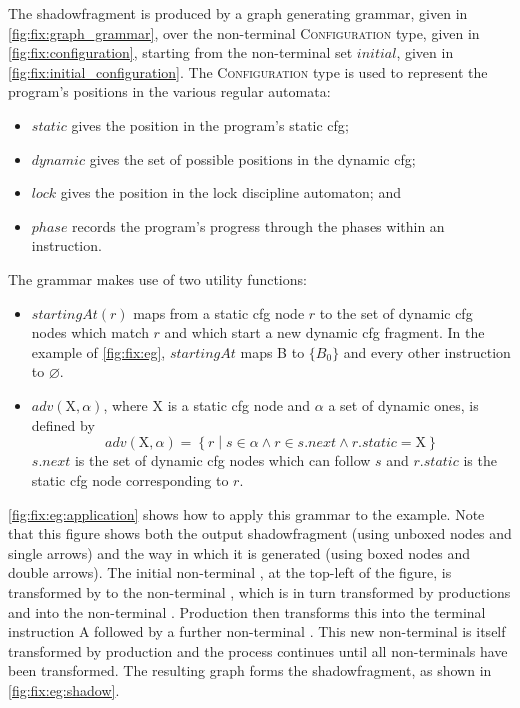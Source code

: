 \noindent
The \gls{shadowfragment} is produced by a graph generating grammar,
given in \autoref{fig:fix:graph_grammar}, over the non-terminal
\textsc{Configuration} type, given in \autoref{fig:fix:configuration},
starting from the non-terminal set $\mathit{initial}$, given in
\autoref{fig:fix:initial_configuration}.  The \textsc{Configuration}
type is used to represent the program's positions in the various
regular automata:
\begin{itemize}
\item $\mathit{static}$ gives the position in the program's
  \gls{static cfg};
\item $\mathit{dynamic}$ gives the set of possible positions in the
  \gls{dynamic cfg};
\item $\mathit{lock}$ gives the position in the lock discipline
  automaton; and
\item $\mathit{phase}$ records the program's progress through the
  phases within an instruction.
\end{itemize}
The grammar makes use of two utility functions:
\begin{itemize}
\item $\mathit{startingAt}(r)$ maps from a \gls{static cfg} node $r$
  to the set of \gls{dynamic cfg} nodes which match $r$ and which
  start a new \gls{dynamic cfg} fragment.  In the example of
  \autoref{fig:fix:eg}, $\mathit{startingAt}$ maps B to $\{B_0\}$ and
  every other instruction to $\varnothing$.
\item $\mathit{adv}(\mathrm{X}, \alpha)$, where $\mathrm{X}$ is a
  \gls{static cfg} node and $\alpha$ a set of dynamic ones, is defined
  by
  \begin{displaymath}
    \mathit{adv}(\mathrm{X}, \alpha) = \left\{r \middle| s \in \alpha \wedge r \in s.\mathit{next} \wedge r.\mathit{static} = \mathrm{X}\right\}
  \end{displaymath}
  $s.\mathit{next}$ is the set of \gls{dynamic cfg} nodes which can
  follow $s$ and $r.\mathit{static}$ is the \gls{static cfg} node
  corresponding to $r$.
\end{itemize}

\noindent
\autoref{fig:fix:eg:application} shows how to apply this grammar to
the example.  Note that this figure shows both the output
\gls{shadowfragment} (using unboxed nodes and single arrows) and the
way in which it is generated (using boxed nodes and double arrows).
The initial non-terminal , at the top-left of the figure, is
transformed by  to the non-terminal , which is in turn
transformed by productions  and  into
the non-terminal .  Production  then transforms this
into the terminal instruction A followed by a further non-terminal
.  This
new non-terminal is itself transformed by production 
and the process continues until all non-terminals have been
transformed.  The resulting graph forms the \gls{shadowfragment}, as
shown in \autoref{fig:fix:eg:shadow}.

